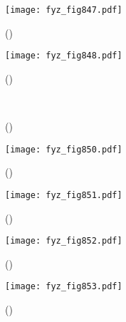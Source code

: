     \begin{figure}[ht!] %
      \centering
      \texttt{[image: fyz\_fig847.pdf]}
      \caption{
               (\cite[s.~707]{Feynman02})}
      \label{fyz:fig847}
    \end{figure}

    \begin{figure}[ht!] %
      \centering
      \texttt{[image: fyz\_fig848.pdf]}
      \caption{
               (\cite[s.~707]{Feynman02})}
      \label{fyz:fig848}
    \end{figure}

    \begin{figure}[ht!] %
      \centering
                     \\
      \caption{
               (\cite[s.~748]{Feynman02})}
      \label{fyz:fig849}
    \end{figure}

    \begin{figure}[ht!] %
      \centering
      \texttt{[image: fyz\_fig850.pdf]}
      \caption{
               (\cite[s.~707]{Feynman02})}
      \label{fyz:fig850}
    \end{figure}

    \begin{figure}[ht!] %
      \centering
      \texttt{[image: fyz\_fig851.pdf]}
      \caption{
               (\cite[s.~707]{Feynman02})}
      \label{fyz:fig851}
    \end{figure}

    \begin{figure}[ht!] %
      \centering
      \texttt{[image: fyz\_fig852.pdf]}
      \caption{
               (\cite[s.~707]{Feynman02})}
      \label{fyz:fig852}
    \end{figure}

    \begin{figure}[ht!] %
      \centering
      \texttt{[image: fyz\_fig853.pdf]}
      \caption{
               (\cite[s.~707]{Feynman02})}
      \label{fyz:fig853}
    \end{figure}

    
